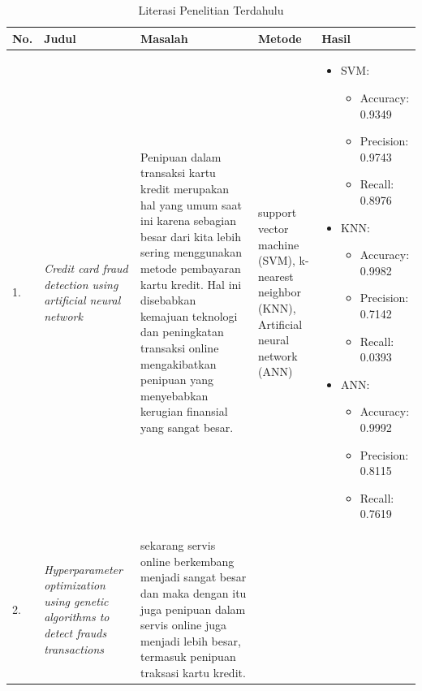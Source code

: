\begin{longtable}{|p{}|p{}|p{}|p{}|p{}|}
 \caption{Literasi Penelitian Terdahulu\label{table:2.literasi}}\\ \hline
 \textbf{No.} & \textbf{Judul} & \textbf{Masalah} & \textbf{Metode} & \textbf{Hasil} \\ \hline
 \endfirsthead
 \endhead
 1. & \textit{Credit card fraud detection using artificial neural network}  &
 Penipuan dalam transaksi kartu kredit merupakan hal yang umum saat ini karena sebagian besar dari kita lebih sering menggunakan metode pembayaran kartu kredit. Hal ini disebabkan kemajuan teknologi dan peningkatan transaksi online mengakibatkan penipuan yang menyebabkan kerugian finansial yang sangat besar. &
 support vector machine (SVM), k-nearest neighbor (KNN), Artificial neural network (ANN) &
 \begin{itemize}[leftmargin=*] %
    \item SVM:
    \begin{itemize}[leftmargin=*] %
        \item Accuracy: 0.9349
        \item Precision: 0.9743
        \item Recall: 0.8976
    \end{itemize}
    \item KNN:
    \begin{itemize}[leftmargin=*] %
        \item Accuracy: 0.9982
        \item Precision: 0.7142
        \item Recall: 0.0393
    \end{itemize}
    \item ANN:
    \begin{itemize}[leftmargin=*] %
        \item Accuracy: 0.9992
        \item Precision: 0.8115
        \item Recall: 0.7619
    \end{itemize}
\end{itemize} \\ \hline
 2. & \textit{Hyperparameter optimization using genetic algorithms to detect frauds transactions} &
 sekarang servis online berkembang menjadi sangat besar dan maka dengan itu juga penipuan dalam servis online juga menjadi lebih besar, termasuk penipuan traksasi kartu kredit. &

\end{longtable}

